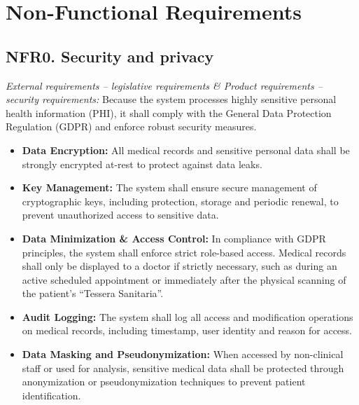 \documentclass[12pt, a4paper]{article}
\begin{document}
\newpage
\section{Non-Functional Requirements}

\subsection{NFR0. Security and privacy} \label{NFR0}
    \textit{External requirements -- legislative requirements \& Product requirements -- security requirements:}
    Because the system processes highly sensitive personal health information (PHI), it shall comply with the General Data Protection Regulation (GDPR) and enforce robust security measures.


\begin{itemize}
    \item \textbf{Data Encryption:} All medical records and sensitive personal data shall be strongly encrypted at-rest to protect against data leaks. 
    
    \item \textbf{Key Management:} The system shall ensure secure management of cryptographic keys, including protection, storage and periodic renewal, to prevent unauthorized access to sensitive data.

    \item \textbf{Data Minimization \& Access Control:} In compliance with GDPR principles, the system shall enforce strict role-based access. Medical records shall only be displayed to a doctor if strictly necessary, such as during an active scheduled appointment or immediately after the physical scanning of the patient's ``Tessera Sanitaria''.

    \item \textbf{Audit Logging:} The system shall log all access and modification operations on medical records, including timestamp, user identity and reason for access.

    \item \textbf{Data Masking and Pseudonymization:} When accessed by non-clinical staff or used for analysis, sensitive medical data shall be protected through anonymization or pseudonymization techniques to prevent patient identification.
\end{itemize}
\\ 
\\ 
\\ 
\\ 
\\ 
\end{document}
